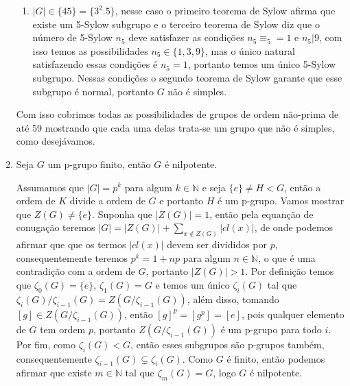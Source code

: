 \documentclass{article}
\begin{document}
\begin{enumerate}
\begin{enumerate}
			\item $|G| \in \{45\} = \{3^{2}.5 \}$, nesse caso o primeiro teorema de Sylow afirma que existe um 5-Sylow subgrupo e o terceiro teorema de Sylow diz que o número de 5-Sylow $n_{5}$ deve satisfazer as condições $n_{5} \equiv_{5} = 1$ e $n_{5}|9$, com isso temos as possibilidades $n_{5} \in \{1, 3, 9\}$, mas o único natural satisfazendo essas condições é $n_{5} = 1$, portanto temos um único 5-Sylow subgrupo. Nessas condições o segundo teorema de Sylow garante que esse subgrupo é normal, portanto $G$ não é simples.
		\end{enumerate}
		
		Com isso cobrimos todas as possibilidades de grupos de ordem não-prima de até 59 mostrando que cada uma delas trata-se um grupo que não é simples, como desejávamos.
		
		\item Seja $G$ um p-grupo finito, então $G$ é nilpotente.
		
		Assumamos que $|G| = p^{k}$ para algum $k \in \mathbb{N}$ e  seja $\{e\} \neq H <G$, então a ordem de $K$ divide a ordem de $G$ e portanto $H$ é um p-grupo. Vamos mostrar que $Z(G) \neq \{e\}$. Suponha que $|Z(G)| = 1$, então pela equanção de conugação teremos $|G| = |Z(G)| + \sum_{x \notin Z(G)} |cl(x)|$, de onde podemos afirmar que que os termos $|cl(x)|$ devem ser divididos por $p$, consequentemente teremos $p^{k} = 1 + np$ para algum $n \in \mathbb{N}$, o que é uma contradição com a ordem de $G$, portanto $|Z(G)|>1$. Por definição temos que $\zeta_{0}(G) = \{e\}$, $\zeta_{1}(G) = G$ e temos um único $\zeta_{i}(G)$ tal que $\zeta_{i}(G)/\zeta_{i-1}(G) = Z(G/\zeta_{i-1}(G))$, além disso, tomando $[g] \in Z(G/\zeta_{i-1}(G))$, então $[g]^{p} = [g^{p}] = [e]$, pois qualquer elemento de $G$ tem ordem $p$, portanto $Z(G/\zeta_{i-1}(G))$ é um p-grupo para todo $i$. Por fim, como $\zeta_{i}(G) < G$, então esses subgrupos são p-grupos também, consequentemente $\zeta_{i-1}(G) \subsetneq \zeta_{i}(G)$. Como $G$ é finito, então podemos afirmar que existe $m \in \mathbb{N}$ tal que $\zeta_{m}(G) = G$, logo $G$ é nilpotente.
	\end{enumerate}
	
	
\end{document}
